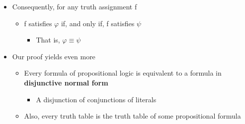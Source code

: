 \documentclass{article}[18pt]
\begin{document}
\begin{itemize}
\item Consequently, for any truth assignment f
\begin{itemize}
\item f satisfies $\varphi$ if, and only if, f satisfies $\psi$
\begin{itemize}
\item That is, $\varphi\equiv\psi$
\end{itemize}
\end{itemize}

\item Our proof yields even more
\begin{itemize}
\item Every formula of propositional logic is equivalent to a formula in \textbf{disjunctive normal form}
\begin{itemize}
\item A disjunction of conjunctions of literals
\end{itemize}
\item Also, every truth table is the truth table of some propositional formula
\end{itemize}
\end{itemize}
\end{document}
